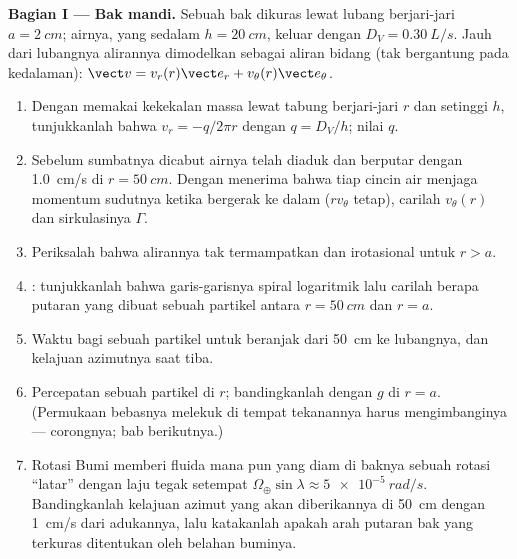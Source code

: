 \begin{problem}
\label{pb:b2:fluid-kinematics:1}

\medskip
\noindent\textbf{Bagian I --- Bak mandi.}
Sebuah bak dikuras lewat lubang berjari-jari $a = \qty{2}{cm}$; airnya,
yang sedalam $h = \qty{20}{cm}$, keluar dengan  $D_V =
\qty{0.30}{L/s}$. Jauh dari lubangnya alirannya dimodelkan sebagai aliran
bidang (tak bergantung pada kedalaman): $\vect v = v_r(r)\vect e_r + v_\theta(r)\vect e_\theta$.
\begin{enumerate}
  \item Dengan memakai kekekalan massa lewat tabung berjari-jari $r$ dan
        setinggi $h$, tunjukkanlah bahwa $v_r = -q/2\pi r$ dengan $q = D_V/h$;
        nilai $q$.
  \item Sebelum sumbatnya dicabut airnya telah diaduk dan berputar
        dengan \qty{1.0}{cm/s} di $r = \qty{50}{cm}$. Dengan menerima
        bahwa tiap cincin air menjaga momentum sudutnya ketika bergerak
        ke dalam ($rv_\theta$ tetap), carilah $v_\theta(r)$ dan
        sirkulasinya $\Gamma$.
  \item Periksalah bahwa alirannya tak termampatkan dan irotasional untuk
        $r > a$.
  \item {}: tunjukkanlah bahwa garis-garisnya spiral logaritmik
        lalu carilah berapa putaran yang dibuat sebuah partikel antara
        $r = \qty{50}{cm}$ dan $r = a$.
  \item Waktu bagi sebuah partikel untuk beranjak dari \qty{50}{cm} ke
        lubangnya, dan kelajuan azimutnya saat tiba.
  \item Percepatan sebuah partikel di $r$; bandingkanlah dengan $g$ di $r = a$.
        (Permukaan bebasnya melekuk di tempat tekanannya harus
        mengimbanginya --- corongnya; bab berikutnya.)
  \item Rotasi Bumi memberi fluida mana pun yang diam di baknya sebuah
        rotasi ``latar'' dengan laju tegak setempat
        $\Omega_\oplus\sin\lambda \approx \qty{5e-5}{rad/s}$. Bandingkanlah
        kelajuan azimut yang akan diberikannya di \qty{50}{cm} dengan
        \qty{1}{cm/s} dari adukannya, lalu katakanlah apakah arah
        putaran bak yang terkuras ditentukan oleh belahan buminya.
\end{enumerate}


\end{problem}
